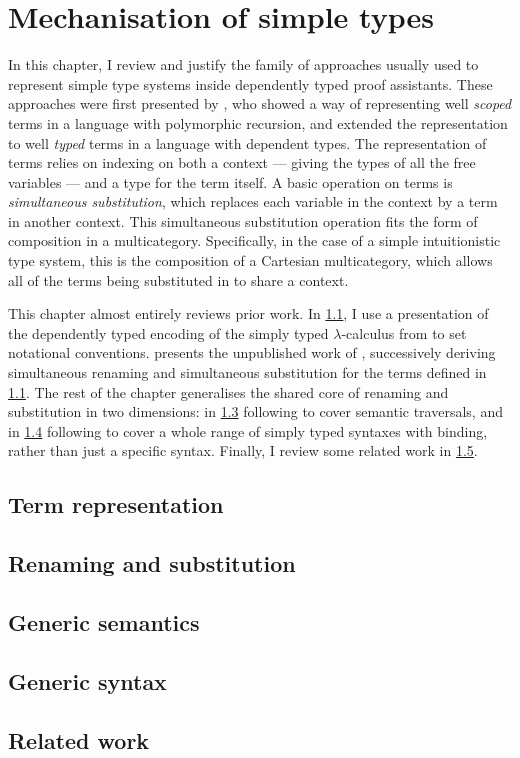\chapter{Mechanisation of simple types}\label{sec:simple}

In this chapter, I review and justify the family of approaches usually used to
represent simple type systems inside dependently typed proof assistants.
These approaches were first presented by \citet{AR99}, who showed a way of
representing well \emph{scoped} terms in a language with polymorphic recursion,
and extended the representation to well \emph{typed} terms in a language with
dependent types.
The representation of terms relies on indexing on both a context --- giving the
types of all the free variables --- and a type for the term itself.
A basic operation on terms is \emph{simultaneous substitution}, which replaces
each variable in the context by a term in another context.
This simultaneous substitution operation fits the form of composition in a
multicategory.
Specifically, in the case of a simple intuitionistic type system, this is the
composition of a Cartesian multicategory, which allows all of the terms being
substituted in to share a context.

This chapter almost entirely reviews prior work.
In \cref{sec:terms}, I use a presentation of the dependently typed encoding of
the simply typed $\lambda$-calculus from \citet{AR99} to set notational
conventions.
 presents the unpublished work of \citet{McBride05},
successively deriving simultaneous renaming and simultaneous substitution for
the terms defined in \cref{sec:terms}.
The rest of the chapter generalises the shared core of renaming and substitution
in two dimensions: in \cref{sec:gen-sem} following \citet{ACMM17} to cover
semantic traversals, and in \cref{sec:gen-syn} following \citet{AACMM21} to
cover a whole range of simply typed syntaxes with binding, rather than just
a specific syntax.
Finally, I review some related work in \cref{sec:mech-related}.

\section{Term representation}\label{sec:terms}

\section{Renaming and substitution}\label{sec:kits}

\section{Generic semantics}\label{sec:gen-sem}

\section{Generic syntax}\label{sec:gen-syn}

%
\section{Related work}\label{sec:mech-related}

